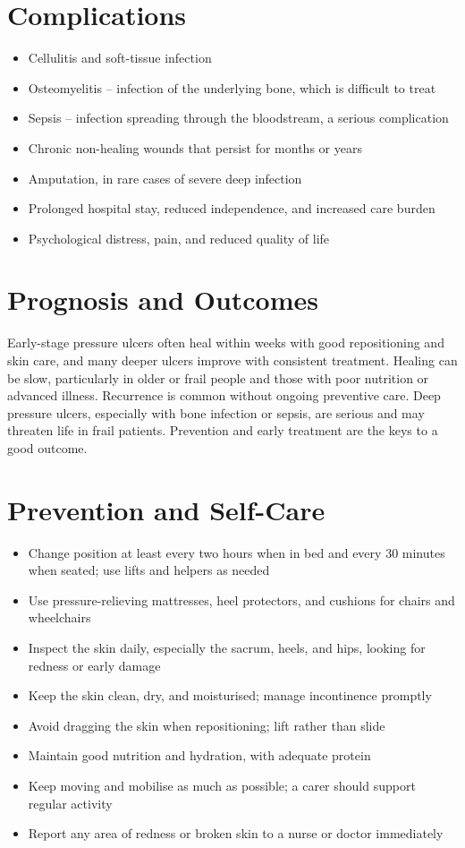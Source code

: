 \section*{Complications}
\begin{itemize}
    \item Cellulitis and soft-tissue infection
    \item Osteomyelitis -- infection of the underlying bone, which is difficult to treat
    \item Sepsis -- infection spreading through the bloodstream, a serious complication
    \item Chronic non-healing wounds that persist for months or years
    \item Amputation, in rare cases of severe deep infection
    \item Prolonged hospital stay, reduced independence, and increased care burden
    \item Psychological distress, pain, and reduced quality of life
\end{itemize}

\section*{Prognosis and Outcomes}
Early-stage pressure ulcers often heal within weeks with good repositioning and skin care, and many deeper ulcers improve with consistent treatment. Healing can be slow, particularly in older or frail people and those with poor nutrition or advanced illness. Recurrence is common without ongoing preventive care. Deep pressure ulcers, especially with bone infection or sepsis, are serious and may threaten life in frail patients. Prevention and early treatment are the keys to a good outcome.

\section*{Prevention and Self-Care}
\begin{itemize}
    \item Change position at least every two hours when in bed and every 30 minutes when seated; use lifts and helpers as needed
    \item Use pressure-relieving mattresses, heel protectors, and cushions for chairs and wheelchairs
    \item Inspect the skin daily, especially the sacrum, heels, and hips, looking for redness or early damage
    \item Keep the skin clean, dry, and moisturised; manage incontinence promptly
    \item Avoid dragging the skin when repositioning; lift rather than slide
    \item Maintain good nutrition and hydration, with adequate protein
    \item Keep moving and mobilise as much as possible; a carer should support regular activity
    \item Report any area of redness or broken skin to a nurse or doctor immediately
\end{itemize}

